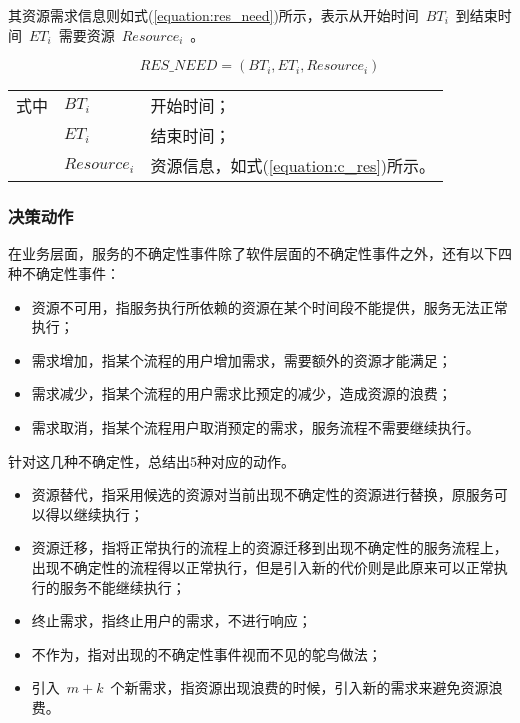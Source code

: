 其资源需求信息则如式(\ref{equation:res_need})所示，表示从开始时间~$BT_i$~到结束时间~$ET_i$~需要资源~${Resource_i}$~。

\begin{equation}\label{equation:res_need}
RES\_NEED = (BT_i, ET_i, Resource_i)
\end{equation}
\begin{tabularx}{\textwidth}{@{}l@{\quad}l@{\pozhehao }X@{}}
    式中
    & ${BT_i}$ & 开始时间；\\
    & ${ET_i}$ & 结束时间；\\
    & ${Resource_i}$ & 资源信息，如式(\ref{equation:c_res})所示。
\end{tabularx}\vspace{\wordsep}

\subsubsection{决策动作}

在业务层面，服务的不确定性事件除了软件层面的不确定性事件之外，还有以下四种不确定性事件：
\begin{itemize}
    \item 资源不可用，指服务执行所依赖的资源在某个时间段不能提供，服务无法正常执行；
    \item 需求增加，指某个流程的用户增加需求，需要额外的资源才能满足；
    \item 需求减少，指某个流程的用户需求比预定的减少，造成资源的浪费；
    \item 需求取消，指某个流程用户取消预定的需求，服务流程不需要继续执行。
\end{itemize}

针对这几种不确定性，总结出5种对应的动作。

\begin{itemize}
    \item 资源替代，指采用候选的资源对当前出现不确定性的资源进行替换，原服务可以得以继续执行；
    \item 资源迁移，指将正常执行的流程上的资源迁移到出现不确定性的服务流程上，出现不确定性的流程得以正常执行，但是引入新的代价则是此原来可以正常执行的服务不能继续执行；
    \item 终止需求，指终止用户的需求，不进行响应；
    \item 不作为，指对出现的不确定性事件视而不见的鸵鸟做法；
    \item 引入~$m+k$~个新需求，指资源出现浪费的时候，引入新的需求来避免资源浪费。
\end{itemize}

